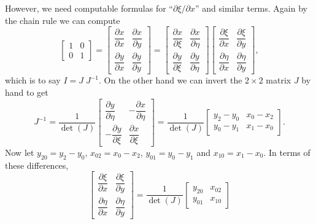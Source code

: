However, we need computable formulas for ``$\partial \xi/\partial x$'' and similar terms.  Again by the chain rule we can compute
\begin{equation*}
\begin{bmatrix}
    1 & 0 \\[0.2em]
    0 & 1
\end{bmatrix}
=\begin{bmatrix}
    \dfrac{\partial x}{\partial x} & \dfrac{\partial x}{\partial y} \\[1.0em]
    \dfrac{\partial y}{\partial x} & \dfrac{\partial y}{\partial y}
\end{bmatrix}
=
\begin{bmatrix}
    \dfrac{\partial x}{\partial \xi} & \dfrac{\partial x}{\partial \eta} \\[1.0em]
    \dfrac{\partial y}{\partial \xi} & \dfrac{\partial y}{\partial \eta}
\end{bmatrix}
\begin{bmatrix}
    \dfrac{\partial \xi}{\partial x} & \dfrac{\partial \xi}{\partial y} \\[1.0em]
    \dfrac{\partial \eta}{\partial x} & \dfrac{\partial \eta}{\partial y}
\end{bmatrix},
\end{equation*}
which is to say $I=J\; J^{-1}$.  On the other hand we can invert the $2\times 2$ matrix $J$ by hand to get
\begin{equation}
J^{-1}
= \frac{1}{\det(J)}
\begin{bmatrix}
    \dfrac{\partial y}{\partial \eta} & -\dfrac{\partial x}{\partial \eta} \\[1.0em]
    -\dfrac{\partial y}{\partial \xi} & \dfrac{\partial x}{\partial \xi}
\end{bmatrix}
= \frac{1}{\det(J)}
\begin{bmatrix}
    y_2-y_0 & x_0-x_2 \\
    y_0-y_1 & x_1-x_0
\end{bmatrix}.  \label{Jinverse}
\end{equation}
Now let $y_{20}=y_2-y_0$, $x_{02}=x_0-x_2$, $y_{01}=y_0-y_1$ and $x_{10}=x_1-x_0$.  In terms of these differences,
\begin{equation}
\begin{bmatrix}
    \dfrac{\partial \xi}{\partial x} & \dfrac{\partial \xi}{\partial y} \\[1.0em]
    \dfrac{\partial \eta}{\partial x} & \dfrac{\partial \eta}{\partial y}
\end{bmatrix}
= \frac{1}{\det(J)}
\begin{bmatrix}
    y_{20} & x_{02} \\
    y_{01} & x_{10}
\end{bmatrix} \label{dxietadxy}
\end{equation}
